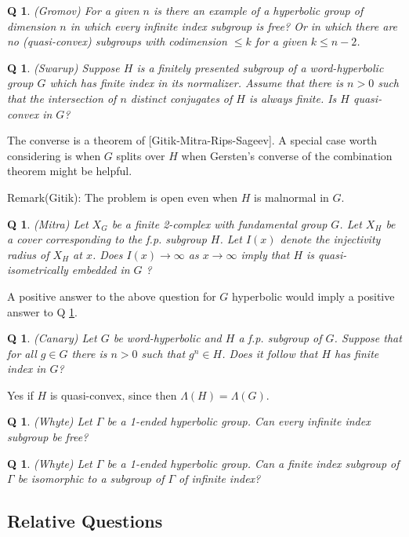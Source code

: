\documentclass[11pt]{article}
\newtheorem{q}[thm]{Q}
\theoremstyle{remark}
\def\b{\begin{q}}
\def\e{\end{q}}
\newcommand{\<}{\langle}
\renewcommand{\>}{\rangle}
\begin{document}
\begin{q}
(Gromov) For a given $n$ is there an example of a hyperbolic group of
dimension $n$ in which every infinite index subgroup is free? Or in which
there are no (quasi-convex) subgroups with codimension $\leq k$ for a given
$k\leq n-2$.
\end{q}



\begin{q}\label{conjugates}
  (Swarup) Suppose $H$ is a finitely presented subgroup of a word-hyperbolic
  group $G$ which has finite index in its normalizer. Assume that there is
  $n>0$ such that the intersection of $n$ distinct conjugates of $H$ is always
  finite. Is $H$ quasi-convex in $G$?
\end{q}

The converse is a theorem of
[Gitik-Mitra-Rips-Sageev]. A special case worth considering is when
$G$ splits over $H$ when Gersten's converse of the combination theorem
might be helpful.

Remark(Gitik): The problem is open even when $H$ is malnormal in $G$.

\begin{q}
(Mitra) Let $X_G$ be a finite 2-complex with fundamental group $G$. Let
$X_H$ be a cover corresponding to the f.p. subgroup $H$. Let $I(x)$
denote the injectivity radius of $X_H$ at $x$.
Does $I(x) \rightarrow \infty$ as $x\rightarrow\infty$
imply that $H$ is quasi-isometrically embedded in $G$ ?
\end{q}
 
A positive answer to the above question for $G$ hyperbolic would imply
a positive answer to Q \ref{conjugates}.

\b
(Canary) Let $G$ be word-hyperbolic and $H$ a f.p. subgroup of $G$.
Suppose that for all $g\in G$ there is $n>0$ such that $g^n\in H$. Does
it follow that $H$ has finite index in $G$? \e

Yes if $H$ is quasi-convex,
since then $\Lambda(H)=\Lambda(G)$.

\b
(Whyte)
Let $\Gamma$ be a 1-ended hyperbolic group. Can every infinite index
subgroup be free?
\e

\b
(Whyte)
Let $\Gamma$ be a 1-ended hyperbolic group. Can a finite index
subgroup of $\Gamma$ be isomorphic to a subgroup of $\Gamma$ of
infinite index?
\e

\subsection{Relative Questions}
\end{document}
